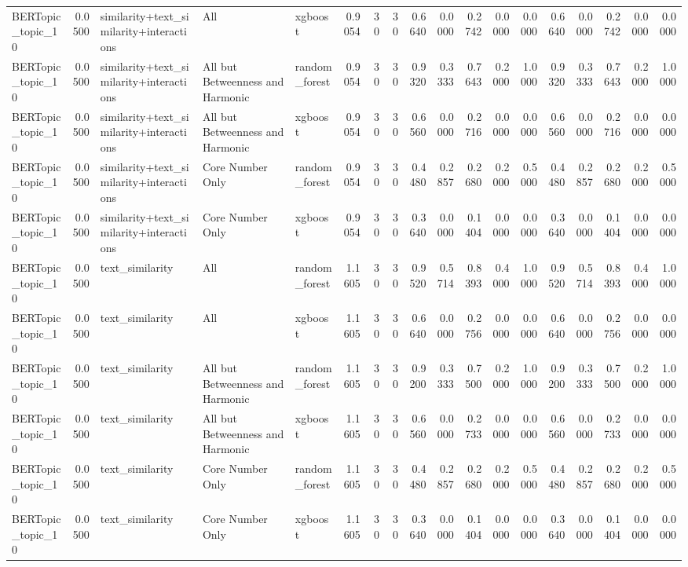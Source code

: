 \begin{tabular}{lrlllrrrrrrrrrrrrr}
BERTopic_topic_10 & 0.0500 & similarity+text_similarity+interactions & All & xgboost & 0.9054 & 30 & 30 & 0.6640 & 0.0000 & 0.2742 & 0.0000 & 0.0000 & 0.6640 & 0.0000 & 0.2742 & 0.0000 & 0.0000 \\
BERTopic_topic_10 & 0.0500 & similarity+text_similarity+interactions & All but Betweenness and Harmonic & random_forest & 0.9054 & 30 & 30 & 0.9320 & 0.3333 & 0.7643 & 0.2000 & 1.0000 & 0.9320 & 0.3333 & 0.7643 & 0.2000 & 1.0000 \\
BERTopic_topic_10 & 0.0500 & similarity+text_similarity+interactions & All but Betweenness and Harmonic & xgboost & 0.9054 & 30 & 30 & 0.6560 & 0.0000 & 0.2716 & 0.0000 & 0.0000 & 0.6560 & 0.0000 & 0.2716 & 0.0000 & 0.0000 \\
BERTopic_topic_10 & 0.0500 & similarity+text_similarity+interactions & Core Number Only & random_forest & 0.9054 & 30 & 30 & 0.4480 & 0.2857 & 0.2680 & 0.2000 & 0.5000 & 0.4480 & 0.2857 & 0.2680 & 0.2000 & 0.5000 \\
BERTopic_topic_10 & 0.0500 & similarity+text_similarity+interactions & Core Number Only & xgboost & 0.9054 & 30 & 30 & 0.3640 & 0.0000 & 0.1404 & 0.0000 & 0.0000 & 0.3640 & 0.0000 & 0.1404 & 0.0000 & 0.0000 \\
BERTopic_topic_10 & 0.0500 & text_similarity & All & random_forest & 1.1605 & 30 & 30 & 0.9520 & 0.5714 & 0.8393 & 0.4000 & 1.0000 & 0.9520 & 0.5714 & 0.8393 & 0.4000 & 1.0000 \\
BERTopic_topic_10 & 0.0500 & text_similarity & All & xgboost & 1.1605 & 30 & 30 & 0.6640 & 0.0000 & 0.2756 & 0.0000 & 0.0000 & 0.6640 & 0.0000 & 0.2756 & 0.0000 & 0.0000 \\
BERTopic_topic_10 & 0.0500 & text_similarity & All but Betweenness and Harmonic & random_forest & 1.1605 & 30 & 30 & 0.9200 & 0.3333 & 0.7500 & 0.2000 & 1.0000 & 0.9200 & 0.3333 & 0.7500 & 0.2000 & 1.0000 \\
BERTopic_topic_10 & 0.0500 & text_similarity & All but Betweenness and Harmonic & xgboost & 1.1605 & 30 & 30 & 0.6560 & 0.0000 & 0.2733 & 0.0000 & 0.0000 & 0.6560 & 0.0000 & 0.2733 & 0.0000 & 0.0000 \\
BERTopic_topic_10 & 0.0500 & text_similarity & Core Number Only & random_forest & 1.1605 & 30 & 30 & 0.4480 & 0.2857 & 0.2680 & 0.2000 & 0.5000 & 0.4480 & 0.2857 & 0.2680 & 0.2000 & 0.5000 \\
BERTopic_topic_10 & 0.0500 & text_similarity & Core Number Only & xgboost & 1.1605 & 30 & 30 & 0.3640 & 0.0000 & 0.1404 & 0.0000 & 0.0000 & 0.3640 & 0.0000 & 0.1404 & 0.0000 & 0.0000 \\

\end{tabular}
